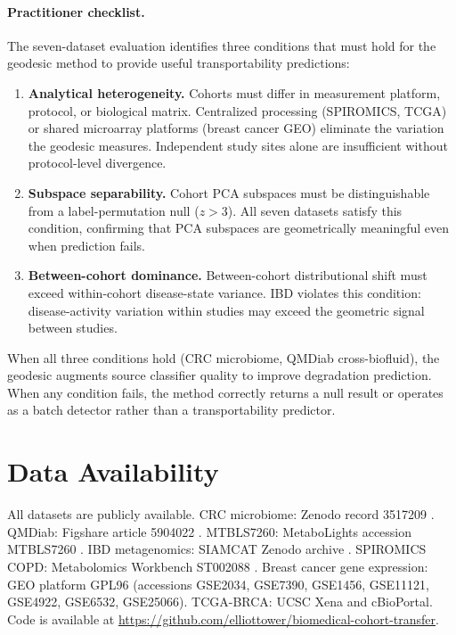 \documentclass{article}
\begin{document}
\paragraph{Practitioner checklist.} The seven-dataset evaluation identifies three conditions that must hold for the geodesic method to provide useful transportability predictions:
\begin{enumerate}
\item \textbf{Analytical heterogeneity.} Cohorts must differ in measurement platform, protocol, or biological matrix. Centralized processing (SPIROMICS, TCGA) or shared microarray platforms (breast cancer GEO) eliminate the variation the geodesic measures. Independent study sites alone are insufficient without protocol-level divergence.
\item \textbf{Subspace separability.} Cohort PCA subspaces must be distinguishable from a label-permutation null ($z > 3$). All seven datasets satisfy this condition, confirming that PCA subspaces are geometrically meaningful even when prediction fails.
\item \textbf{Between-cohort dominance.} Between-cohort distributional shift must exceed within-cohort disease-state variance. IBD violates this condition: disease-activity variation within studies may exceed the geometric signal between studies.
\end{enumerate}
When all three conditions hold (CRC microbiome, QMDiab cross-biofluid), the geodesic augments source classifier quality to improve degradation prediction. When any condition fails, the method correctly returns a null result or operates as a batch detector rather than a transportability predictor.

\section*{Data Availability}

All datasets are publicly available. CRC microbiome: Zenodo record 3517209 \citep{wirbel2019meta}. QMDiab: Figshare article 5904022 \citep{yousri2015metabolic}. MTBLS7260: MetaboLights accession MTBLS7260 \citep{leonletelier2024contributions}. IBD metagenomics: SIAMCAT Zenodo archive \citep{wirbel2021siamcat}. SPIROMICS COPD: Metabolomics Workbench ST002088 \citep{bowler2017spiromics}. Breast cancer gene expression: GEO platform GPL96 (accessions GSE2034, GSE7390, GSE1456, GSE11121, GSE4922, GSE6532, GSE25066). TCGA-BRCA: UCSC Xena and cBioPortal. Code is available at \url{https://github.com/elliottower/biomedical-cohort-transfer}.



\end{document}
